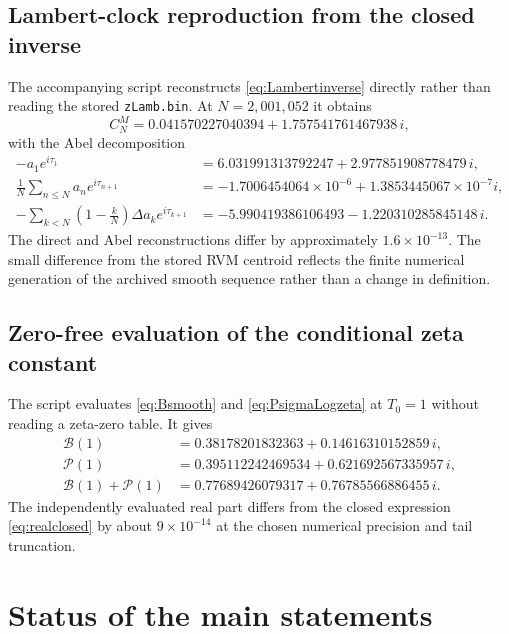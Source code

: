 \documentclass[11pt]{amsart}
\numberwithin{equation}{section}
\theoremstyle{definition}
\theoremstyle{remark}
\newcommand{\cP}{\mathcal P}
\newcommand{\cB}{\mathcal B}
\begin{document}
\subsection{Lambert-clock reproduction from the closed inverse}
The accompanying script  reconstructs \eqref{eq:Lambertinverse} directly rather than reading the stored \texttt{zLamb.bin}.  At $N=2{,}001{,}052$ it obtains
\[
C_N^M
=0.041570227040394+1.757541761467938\,i,
\]
with the Abel decomposition
\begin{align*}
-a_1e^{i\tau_1}
&=6.031991313792247+2.977851908778479\,i,\\
\frac1N\sum_{n\le N}a_ne^{i\tau_{n+1}}
&=-1.7006454064\times10^{-6}+1.3853445067\times10^{-7}i,\\
-\sum_{k<N}\left(1-\frac{k}{N}\right)\Delta a_ke^{i\tau_{k+1}}
&=-5.990419386106493-1.220310285845148\,i.
\end{align*}
The direct and Abel reconstructions differ by approximately $1.6\times10^{-13}$.  The small difference from the stored RVM centroid reflects the finite numerical generation of the archived smooth sequence rather than a change in definition.

\subsection{Zero-free evaluation of the conditional zeta constant}
The script  evaluates \eqref{eq:Bsmooth} and \eqref{eq:PsigmaLogzeta} at $T_0=1$ without reading a zeta-zero table.  It gives
\begin{align*}
\cB(1)&=0.38178201832363+0.14616310152859\,i,\\
\cP(1)&=0.395112242469534+0.621692567335957\,i,\\
\cB(1)+\cP(1)&=0.77689426079317+0.76785566886455\,i.
\end{align*}
The independently evaluated real part differs from the closed expression \eqref{eq:realclosed} by about $9\times10^{-14}$ at the chosen numerical precision and tail truncation.

\section{Status of the main statements}\label{sec:status}
\end{document}
